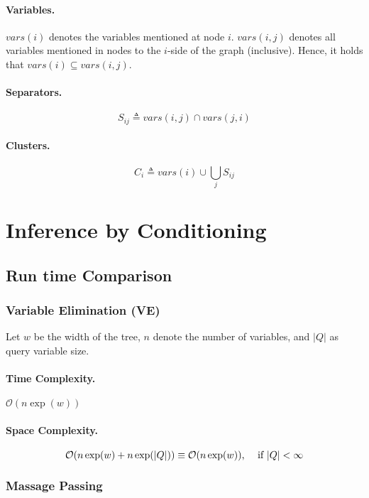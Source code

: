 \documentclass[11pt]{article}
\begin{document}
\paragraph{Variables.}
$vars(i)$ denotes the variables mentioned at node $i$. $vars(i, j)$ denotes all variables mentioned in nodes to the $i$-side of the graph (inclusive). Hence, it holds that $vars(i) \subseteq vars(i, j)$.

\paragraph{Separators.} 
\begin{equation}
	S_{ij} \triangleq vars(i, j) \cap vars(j, i)
\end{equation}

\paragraph{Clusters.} 
\begin{equation}
	C_i \triangleq vars(i) \cup \bigcup_j S_{ij}
\end{equation}

\section{Inference by Conditioning}
\subsection{Run time Comparison}
\subsubsection{Variable Elimination (VE)}
Let $w$ be the width of the tree, $n$ denote the number of variables, and $|Q|$ as query variable size.
\paragraph{Time Complexity.} $\mathcal O (n \exp (w))$

\paragraph{Space Complexity.} 
\begin{equation}
	\mathcal O (n \exp (w) + n \exp (|Q|)) \equiv \mathcal O (n \exp (w)) \text{, \quad if } |Q| < \infty
\end{equation}

\subsubsection{Massage Passing}
\end{document}
